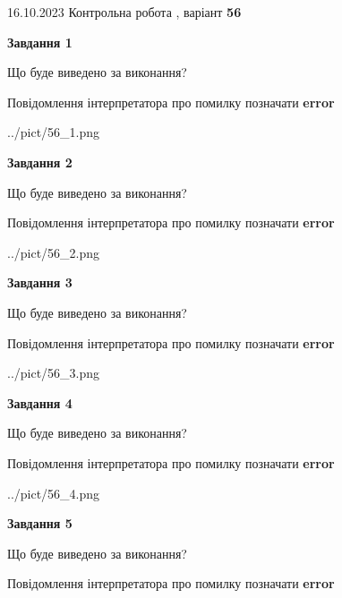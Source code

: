 \documentclass[12pt, ukrainian]{article}
\begin{document}
{\Large{16.10.2023 Контрольна робота , варіант  \No \textbf { 56 }\par}}
{
\begin {large}
{\begin {center}\textbf{Завдання 1}\end {center}}\par
Що буде виведено за виконання? \par
Повідомлення інтерпретатора про помилку позначати \textbf{error}

\begin{center}
	{../pict/56_1.png}
\end{center}
\newpage

{\begin {center}\textbf{Завдання 2}\end {center}}\par
Що буде виведено за виконання? \par
Повідомлення інтерпретатора про помилку позначати \textbf{error}

\begin{center}
	{../pict/56_2.png}
\end{center}
\newpage

{\begin {center}\textbf{Завдання 3}\end {center}}\par
Що буде виведено за виконання? \par
Повідомлення інтерпретатора про помилку позначати \textbf{error}

\begin{center}
	{../pict/56_3.png}
\end{center}
\newpage

{\begin {center}\textbf{Завдання 4}\end {center}}\par
Що буде виведено за виконання? \par
Повідомлення інтерпретатора про помилку позначати \textbf{error}

\begin{center}
	{../pict/56_4.png}
\end{center}
\newpage

{\begin {center}\textbf{Завдання 5}\end {center}}\par
Що буде виведено за виконання? \par
Повідомлення інтерпретатора про помилку позначати \textbf{error}


\end{large}}
\end{document}
